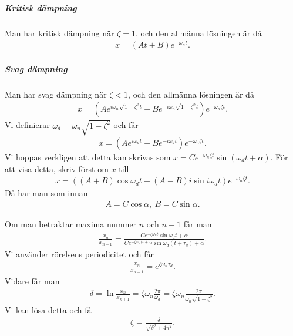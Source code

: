 \subparagraph{Kritisk dämpning}
Man har kritisk dämpning när $\zeta = 1$, och den allmänna lösningen är då
\begin{align*}
	x = (At + B)e^{-\omega_nt}.
\end{align*}

\subparagraph{Svag dämpning}
Man har svag dämpning när $\zeta < 1$, och den allmänna lösningen är då
\begin{align*}
	x = \left(Ae^{i\omega_n\sqrt{1 - \zeta^2}t} + Be^{-i\omega_n\sqrt{1 - \zeta^2}t}\right)e^{-\omega_n\zeta t}.
\end{align*}
Vi definierar $\omega_d = \omega_n\sqrt{1 - \zeta^2}$ och får
\begin{align*}
	x = \left(Ae^{i\omega_dt} + Be^{-i\omega_dt}\right)e^{-\omega_n\zeta t}.
\end{align*}
Vi hoppas verkligen att detta kan skrivas som $x = Ce^{-\omega_n\zeta t}\sin{\left(\omega_dt + \alpha\right)}$. För att visa detta, skriv först om $x$ till
\begin{align*}
	x = \left((A + B)\cos{\omega_dt} + (A - B)i\sin{i\omega_dt}\right)e^{-\omega_n\zeta t}.
\end{align*}
Då har man som innan
\begin{align*}
	A = C\cos{\alpha},\ B = C\sin{\alpha}.
\end{align*}

Om man betraktar maxima nummer $n$ och $n - 1$ får man
\begin{align*}
	\frac{x_{n}}{x_{n + 1}} = \frac{Ce^{-\zeta\omega_nt}\sin{\omega_dt + \alpha}}{Ce^{-\zeta\omega_n(t + \tau_d}\sin{\omega_d(t + \tau_d) + \alpha}}.
\end{align*}
Vi använder rörelsens periodicitet och får
\begin{align*}
	\frac{x_{n}}{x_{n + 1}} = e^{\zeta\omega_n\tau_{d}}.
\end{align*}
Vidare får man
\begin{align*}
	\delta = \ln{\frac{x_n}{x_{n + 1}}} = \zeta\omega_n\frac{2\pi}{\omega_d} = \zeta\omega_n\frac{2\pi}{\omega_n\sqrt{1 - \zeta^2}}.
\end{align*}
Vi kan lösa detta och få
\begin{align*}
	\zeta = \frac{\delta}{\sqrt{\delta^2 + 4\pi^2}}.
\end{align*}